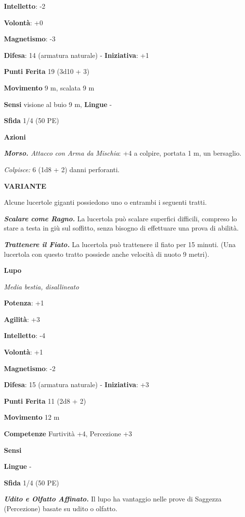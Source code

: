 \begin{multicols}{2}
\textbf{Intelletto}: -2

\textbf{Volontà}: +0

\textbf{Magnetismo}: -3

\textbf{Difesa}: 14 (armatura naturale) - \textbf{Iniziativa}: +1

\textbf{Punti Ferita} 19 (3d10 + 3)

\textbf{Movimento} 9 m, scalata 9 m

\textbf{Sensi} visione al buio 9 m, 
\textbf{Lingue} -

\textbf{Sfida} 1/4 (50 PE)\smallskip

\smallskip\textbf{Azioni}

\emph{\textbf{Morso.} Attacco con Arma da Mischia}: +4 a colpire,
portata 1 m, un bersaglio.

\emph{Colpisce:} 6 (1d8 + 2) danni perforanti.

\textbf{VARIANTE}

Alcune lucertole giganti possiedono uno o entrambi i seguenti tratti.

\emph{\textbf{Scalare come Ragno.}} La lucertola può scalare superfici
difficili, compreso lo stare a testa in giù sul soffitto, senza bisogno
di effettuare una prova di abilità.

\emph{\textbf{Trattenere il Fiato.}} La lucertola può trattenere il
fiato per 15 minuti. (Una lucertola con questo tratto possiede anche
velocità di nuoto 9 metri).

\textbf{Lupo}

\emph{Media bestia, disallineato}

\textbf{Potenza}: +1

\textbf{Agilità}: +3

\textbf{Intelletto}: -4

\textbf{Volontà}: +1

\textbf{Magnetismo}: -2

\textbf{Difesa}: 15 (armatura naturale) - \textbf{Iniziativa}: +3

\textbf{Punti Ferita} 11 (2d8 + 2)

\textbf{Movimento} 12 m

\textbf{Competenze} Furtività +4, Percezione +3

\textbf{Sensi} 

\textbf{Lingue} -

\textbf{Sfida} 1/4 (50 PE)\smallskip

\emph{\textbf{Udito e Olfatto Affinato.}} Il lupo ha vantaggio nelle
prove di Saggezza (Percezione) basate su udito o olfatto.


\end{multicols}
